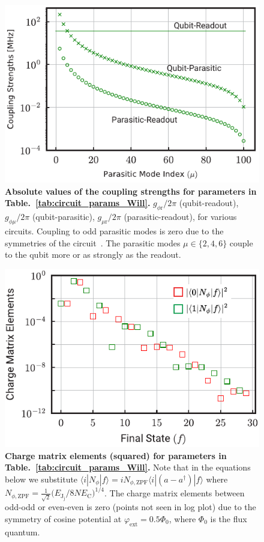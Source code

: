 \documentclass[%
reprint,
superscriptaddress,
 amsmath,amssymb,
 aps,
 prx,
longbibliography,
floatfix,
]{revtex4-2}
\begin{document}
\begin{figure}[htb]
    \centering
    \includegraphics[width=\linewidth]{Supp_Fig/Coupling-Will.pdf}
    \caption{{\bf Absolute values of the coupling strengths for parameters in Table.~\ref{tab:circuit_params_Will}.} $g_{\phi \textrm{r}}/2\pi$ (qubit-readout), $g_{\phi\mu}/2\pi$ (qubit-parasitic), $g_{\mu \textrm{r}}/2\pi$ (parasitic-readout), for various circuits. Coupling to odd parasitic modes is zero due to the symmetries of the circuit~\cite{viola2015collective}. The parasitic modes $\mu\in\{2,4,6\}$ couple to the qubit more or as strongly as the readout.}
    \label{fig:coupling-strength-Will}
\end{figure}
\begin{figure}[htb]
    \centering
    \includegraphics[width=\linewidth]{Supp_Fig/Charge-matrix-Will.pdf}
    \caption{{\bf Charge matrix 
 elements (squared) for parameters in Table.~\ref{tab:circuit_params_Will}.} Note that in the equations below we substitute $\langle i|N_\phi|f\rangle=iN_{\phi,\mathrm{ZPF}}\langle i|(a-a^\dagger)|f\rangle$ where $N_{\phi,\mathrm{ZPF}}=\frac{1}{\sqrt{2}}\Big(E_{\textrm{J}_\textrm{j}}/8NE_{\textrm{C}}\Big)^{1/4}$. The charge matrix elements between odd-odd or even-even is zero (points not seen in log plot) due to the symmetry of cosine potential at $\varphi_\mathrm{ext}=0.5\Phi_0$, where $\Phi_0$ is the flux quantum.}
    \label{fig:charge-matrix-Will}
\end{figure}
\end{document}
